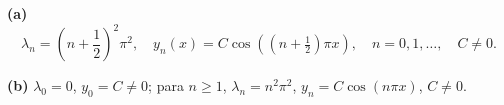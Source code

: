\noindent\textbf{(a)} \[\lambda_n=\left(n+\frac12\right)^2\pi^2,\quad
y_n(x)=C\cos\left((n+\tfrac12)\pi x\right),\quad n=0,1,\ldots,\quad C\ne0.\]

\noindent\textbf{(b)} \(\lambda_0=0\), \(y_0=C\ne0\); para \(n\ge1\),
\(\lambda_n=n^2\pi^2\), \(y_n=C\cos(n\pi x)\), \(C\ne0\).
